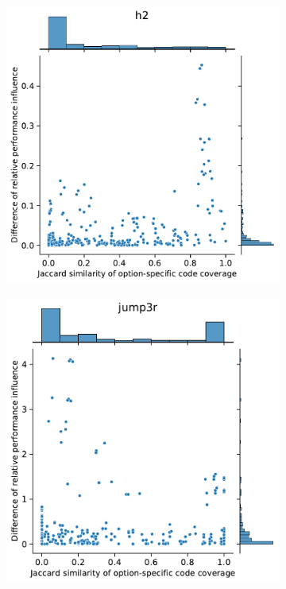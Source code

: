 {\begin{figure}
\begin{subfigure}{0.33\textwidth}
	\end{subfigure}
	\begin{subfigure}{0.33\textwidth}
		\centering
		\includegraphics[width=\linewidth]{images/rq3.2/h2_rq3.2.pdf}
	\end{subfigure}
	\begin{subfigure}{0.33\textwidth}
		\centering
		\includegraphics[width=\linewidth]{images/rq3.2/jump3r_rq3.2.pdf}

\end{subfigure}
\end{figure}}
